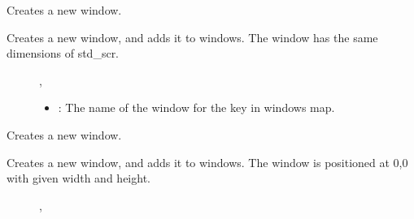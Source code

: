 \documentclass[letterpaper,10pt,english]{sphinxmanual}
\begin{document}
\begin{fulllineitems}
\begin{fulllineitems}
\begin{description}
\end{description}


\end{fulllineitems}


\begin{fulllineitems}
\label{\detokenize{index:_CPPv2N7ostendo10InitWindowENSt6stringE}}%
\pysigstartmultiline
{}\label{\detokenize{index:Pessumnamespaceostendo_1a47ee72208333eea02c3737d540d0267b}}%
\pysigstopmultiline
Creates a new window. 

Creates a new window, and adds it to windows. The window has the same dimensions of std\_scr. \begin{description}
\item[{}] \leavevmode
{\hyperref[\detokenize{index:Pessumnamespaceostendo_1ab45e3689aa0cb8a2e3a175c0aed97880}]{}}, {\hyperref[\detokenize{index:Pessumnamespaceostendo_1a4c5850c8a109e159e874ecce8a5dc62a}]{}} 

\item[{}] \leavevmode\begin{itemize}
\item {} 
: The name of the window for the key in windows map. 

\end{itemize}

\end{description}


\end{fulllineitems}


\begin{fulllineitems}
\label{\detokenize{index:_CPPv2N7ostendo10InitWindowENSt6stringEii}}%
\pysigstartmultiline
{}\label{\detokenize{index:Pessumnamespaceostendo_1a9a1f177f0bc76d81901078af708114f6}}%
\pysigstopmultiline
Creates a new window. 

Creates a new window, and adds it to windows. The window is positioned at 0,0 with given width and height. \begin{description}
\item[{}] \leavevmode
{\hyperref[\detokenize{index:Pessumnamespaceostendo_1ab45e3689aa0cb8a2e3a175c0aed97880}]{}}, {\hyperref[\detokenize{index:Pessumnamespaceostendo_1a4c5850c8a109e159e874ecce8a5dc62a}]{}} 


\end{description}
\end{fulllineitems}
\end{fulllineitems}
\end{document}
